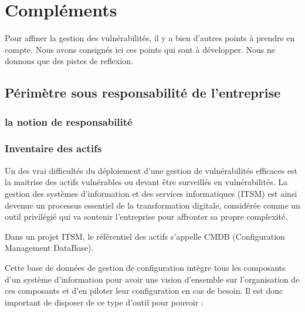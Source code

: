 
\section{Compléments}

Pour affiner la gestion des vulnérabilités, il y a bien d'autres points à prendre en compte. Nous avons consignés ici ces points qui sont à développer. Nous ne donnons que des pistes de reflexion.
\subsection{Périmètre sous responsabilité de l’entreprise}

\subsubsection{la notion de responsabilité}


\subsubsection{Inventaire des actifs}

Un des vrai difficultés du déploiement d'une gestion de vulnérabilités efficaces est la maitrise des actifs vulnérables ou devant être surveillés en vulnérabilités.
La gestion des systèmes d'information et des services informatiques (ITSM) est ainsi devenue un processus essentiel de la transformation digitale, considérée comme un outil privilégié qui va soutenir l’entreprise pour affronter sa propre complexité.

Dans un projet ITSM, le référentiel des actifs s’appelle CMDB (Configuration Management DataBase).

Cette base de données de gestion de configuration intègre  tous les composants d’un système d'information pour  avoir une vision d’ensemble sur l’organisation de ces composants et d’en piloter leur configuration en cas de besoin.
Il est donc important de disposer de ce type d'outil pour pouvoir :

